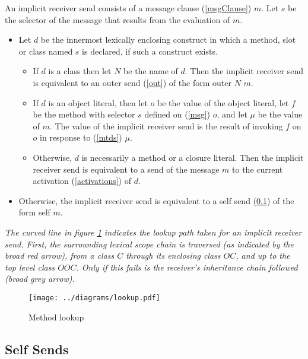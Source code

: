 \documentclass{article}
\newcommand{\code}[1]{{\sf #1}}
\begin{document}
An implicit receiver send consists of a message clause (\ref{msgClause}) $m$.  
Let $s$ be the selector of the message that results from the evaluation of $m$.
\begin{itemize}
\item
Let $d$ be the innermost lexically enclosing construct in which a method, slot or class named $s$ is declared, if such a construct exists. 
  \begin{itemize}
    \item  If $d$ is a class then let $N$ be the name of $d$. Then the implicit receiver send is equivalent to an outer send (\ref{out}) of the form \code{outer $N$ $m$}.
    \item If $d$ is an object literal, then let  $o$ be the value of the object literal, let $f$ be the method with selector $s$ defined on (\ref{msg}) $o$, and let $\mu$ be the value of $m$. The value of the implicit receiver send is the result of invoking $f$  on $o$ in response to (\ref{mtds})  $\mu$.
  \item Otherwise, $d$ is necessarily a method or a closure literal. Then the implicit receiver send is equivalent to a send of the message $m$ to the current activation (\ref{activations}) of $d$.
 \end{itemize}
\item
Otherwise, the implicit receiver send is equivalent to a self send (\ref{self}) of the form \code{self $m$}.
\end{itemize}

{\it
The curved line in figure \ref{implicitSends} indicates the lookup path taken for an implicit receiver send. First, the surrounding lexical scope chain is traversed (as indicated by the broad red arrow), from a class $C$ through its enclosing class $OC$, and up to the top level class $OOC$. Only if this fails is the receiver's inheritance chain followed (broad grey arrow).

\begin{figure}
\texttt{[image: ../diagrams/lookup.pdf]}
\caption{Method lookup}
\label{implicitSends}
\end{figure}
}

\subsection{Self Sends}
\label{self}
\end{document}

